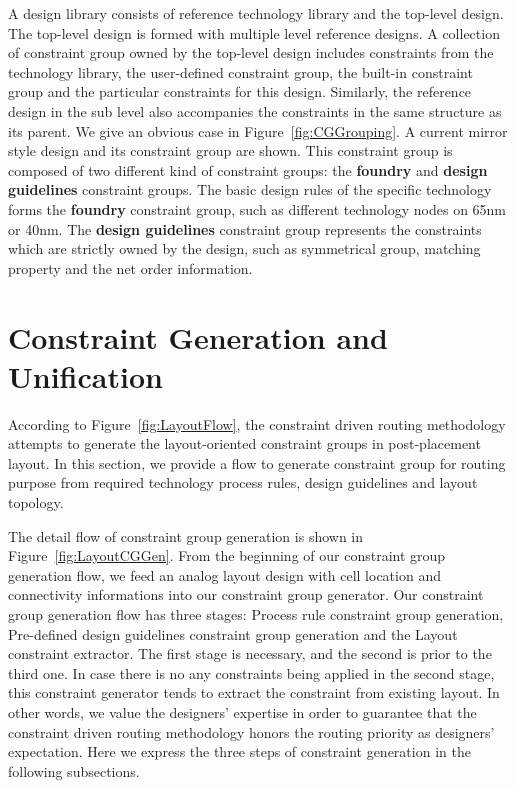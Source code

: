     A design library consists of reference technology library and the top-level design. The top-level design is formed with multiple level reference designs. A collection of constraint group owned by the top-level design includes constraints from the technology library, the user-defined constraint group, the built-in constraint group and the particular constraints for this design. Similarly, the reference design in the sub level also accompanies the constraints in the same structure as its parent. We give an obvious case in Figure~\ref{fig:CGGrouping}. A current mirror style design and its constraint group are shown. This constraint group is composed of two different kind of constraint groups: the {\bf foundry} and {\bf design guidelines} constraint groups. The basic design rules of the specific technology forms the {\bf foundry} constraint group, such as different technology nodes on  65nm or 40nm. The {\bf design guidelines} constraint group represents the constraints which are strictly owned by the design, such as symmetrical group, matching property and the net order information.

  \section{Constraint Generation and Unification}\label{sec:ConGenUni}

    According to Figure~\ref{fig:LayoutFlow}, the constraint driven routing methodology attempts to generate the layout-oriented constraint groups in post-placement layout. In this section, we provide a flow to generate constraint group for routing purpose from required technology process rules, design guidelines and layout topology. 
  
    The detail flow of constraint group generation is shown in Figure~\ref{fig:LayoutCGGen}. From the beginning of our constraint group generation flow, we feed an analog layout design with cell location and connectivity informations into our constraint group generator. Our constraint group generation flow has three stages: Process rule constraint group generation, Pre-defined design guidelines constraint group generation and the Layout constraint extractor. The first stage is necessary, and the second is prior to the third one. In case there is no any constraints being applied in the second stage, this constraint generator tends to extract the constraint from existing layout. In other words, we value the designers' expertise in order to guarantee that the constraint driven routing methodology honors the routing priority as designers' expectation. Here we express the three steps of constraint generation in the following subsections. 
    
